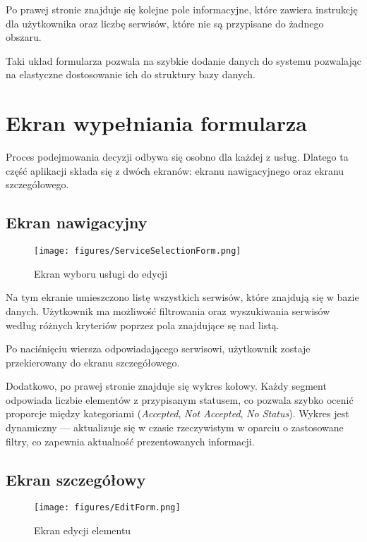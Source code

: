  Po  prawej stronie znajduje się kolejne pole informacyjne, które zawiera instrukcję dla użytkownika oraz liczbę serwisów, które nie są przypisane do żadnego obszaru.
\vspace{0.5cm}

Taki układ formularza pozwala na szybkie dodanie danych do systemu pozwalając na elastyczne dostosowanie ich do struktury bazy danych.

\section{Ekran wypełniania formularza}
Proces podejmowania decyzji odbywa się osobno dla każdej z usług. Dlatego ta część aplikacji składa się z dwóch ekranów: ekranu nawigacyjnego oraz ekranu szczegółowego.

\subsection{Ekran nawigacyjny}
 \begin{figure}[h]
 \centering
 \texttt{[image: figures/ServiceSelectionForm.png]}
 \caption{Ekran wyboru usługi do edycji}
 \label{fig:ServiceSelectionForm }
 \end{figure}

 Na tym ekranie umieszczono listę wszystkich serwisów, które znajdują się w bazie danych. Użytkownik ma możliwość filtrowania oraz wyszukiwania serwisów według różnych kryteriów poprzez pola znajdujące sę nad listą.

 Po naciśnięciu wiersza odpowiadającego serwisowi, użytkownik zostaje przekierowany do ekranu szczegółowego.

 Dodatkowo, po prawej stronie znajduje się wykres kołowy. Każdy segment odpowiada liczbie elementów z przypisanym statusem, co pozwala szybko ocenić proporcje między kategoriami (\emph{Accepted}, \emph{Not Accepted}, \emph{No Status}). Wykres jest dynamiczny — aktualizuje się w czasie rzeczywistym w oparciu o zastosowane filtry, co zapewnia aktualność prezentowanych informacji.

 \subsection{Ekran szczegółowy}


 \begin{figure}[h]
 \centering
 \texttt{[image: figures/EditForm.png]}
 \caption{Ekran edycji elementu}
 \label{fig:EditForm}
 \end{figure}

